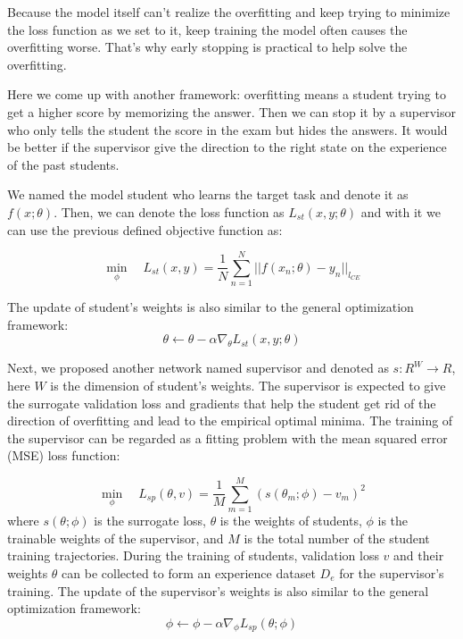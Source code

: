 \documentclass[english]{sobraep}
\begin{document}
Because the model itself can't realize the overfitting and keep trying to minimize the loss function as we set to it, keep training the model often causes the overfitting worse. That's why early stopping is practical to help solve the overfitting.

Here we come up with another framework: overfitting means a student trying to get a higher score by memorizing the answer. Then we can stop it by a supervisor who only tells the student the score in the exam but hides the answers. It would be better if the supervisor give the direction to the right state on the experience of the past students.

We named the model student who learns the target task and denote it as $f(x;\theta)$. Then, we can denote the loss function as $L_{st}(x,y;\theta)$ and with it we can use the previous defined objective function as:

\begin{equation} \label{eqn:student}
    \min \limits_{\phi} \quad L_{st}(x,y) = \frac{1}{N} \sum_{n=1}^{N}||f(x_n; \theta)-y_n||_{l_{CE}}
\end{equation}

The update of student's weights is also similar to the general optimization framework:
\begin{equation}\label{eqn:st_sgd}
    \theta \xleftarrow{} \theta  - \alpha\nabla_{\theta}L_{st}(x,y;\theta)
\end{equation}

Next, we proposed another network named supervisor and denoted as $s: R^W \xrightarrow{} R$, here $W$ is the dimension of student's weights. The supervisor is expected to give the surrogate validation loss and gradients that help the student get rid of the direction of overfitting and lead to the empirical optimal minima. The training of the supervisor can be regarded as a fitting problem with the mean squared error (MSE) loss function:

\begin{equation} \label{eqn:supervisor}
    \min \limits_{\phi} \quad L_{sp}(\theta,v) = \frac{1}{M} \sum_{m=1}^{M}(s(\theta_m;\phi)-v_m)^2
\end{equation}
where $s(\theta; \phi)$ is the surrogate loss, $\theta$ is the weights of students, $\phi$ is the trainable weights of the supervisor, and $M$ is the total number of the student training trajectories. During the training of students, validation loss $v$ and their weights $\theta$ can be collected to form an experience dataset $D_e$ for the supervisor's training. The update of the supervisor's weights is also similar to the general optimization framework:
\begin{equation}\label{eqn:sp_sgd}
    \phi \xleftarrow{} \phi  - \alpha\nabla_{\phi}L_{sp}(\theta;\phi)
\end{equation}
\end{document}
